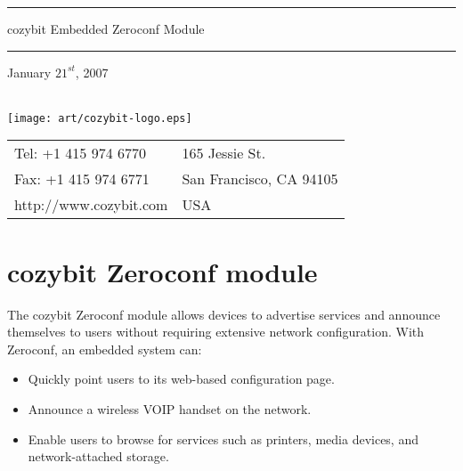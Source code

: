 \documentclass[11pt,titlepage]{article}
\begin{document}
\begin{titlepage}
\lstset{language=c}
\newcommand\HRule{\noindent\rule{\linewidth}{1.5pt}}
\HRule
\begin{center}
	\LARGE cozybit Embedded Zeroconf Module
\end{center}
\HRule
{}
\vspace{1in}
\begin{center}
	\Large
{\small January $21^{st}$, 2007}\\
\rule{0pt}{20ex}\\
\texttt{[image: art/cozybit-logo.eps]}\\
\vspace{3ex}
{\scriptsize 
\begin{tabular}{l l}
Tel: +1 415 974 6770 	& 165 Jessie St. \\
Fax: +1 415 974 6771    & San Francisco, CA 94105 \\
http://www.cozybit.com  & USA \\
\end{tabular}}
\end{center}
\end{titlepage}
\clearpage


\section{cozybit Zeroconf module}

The cozybit Zeroconf module allows devices to advertise services and announce 
themselves to users without requiring extensive network configuration.  With 
Zeroconf, an embedded system can:

\begin{itemize}
	\item Quickly point users to its web-based configuration page.
	\item Announce a wireless VOIP handset on the network.
	\item Enable users to browse for services such as printers, media
		  devices, and network-attached storage.
\end{itemize}
\end{document}

